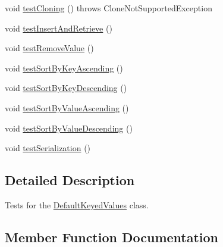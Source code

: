 \begin{DoxyCompactItemize}
void \mbox{\hyperlink{classorg_1_1jfree_1_1data_1_1_default_keyed_values_test_ae61c801d0aa6994ce63026c237d2afb6}{test\+Cloning}} ()  throws Clone\+Not\+Supported\+Exception 
\item 
void \mbox{\hyperlink{classorg_1_1jfree_1_1data_1_1_default_keyed_values_test_a58c61babef81ddc73653ab9369f1a5ca}{test\+Insert\+And\+Retrieve}} ()
\item 
void \mbox{\hyperlink{classorg_1_1jfree_1_1data_1_1_default_keyed_values_test_aaa38834ef25e2a65909caf28db5c23a7}{test\+Remove\+Value}} ()
\item 
void \mbox{\hyperlink{classorg_1_1jfree_1_1data_1_1_default_keyed_values_test_a528f8fecf5c9c056de5b6d818a2ff8d2}{test\+Sort\+By\+Key\+Ascending}} ()
\item 
void \mbox{\hyperlink{classorg_1_1jfree_1_1data_1_1_default_keyed_values_test_a345a1570ab23503e31aac91e59614577}{test\+Sort\+By\+Key\+Descending}} ()
\item 
void \mbox{\hyperlink{classorg_1_1jfree_1_1data_1_1_default_keyed_values_test_a1c90ee641414221082c5bd814330ab65}{test\+Sort\+By\+Value\+Ascending}} ()
\item 
void \mbox{\hyperlink{classorg_1_1jfree_1_1data_1_1_default_keyed_values_test_ad50e68827bfb6c9b71cd32501649a067}{test\+Sort\+By\+Value\+Descending}} ()
\item 
void \mbox{\hyperlink{classorg_1_1jfree_1_1data_1_1_default_keyed_values_test_a3b019c531aead81b576e6717bcbb1388}{test\+Serialization}} ()
\end{DoxyCompactItemize}


\subsection{Detailed Description}
Tests for the \mbox{\hyperlink{classorg_1_1jfree_1_1data_1_1_default_keyed_values}{Default\+Keyed\+Values}} class. 

\subsection{Member Function Documentation}
\mbox{\label{classorg_1_1jfree_1_1data_1_1_default_keyed_values_test_a4ef3ae69a6a349c8ed66833a08806d6b}} 
